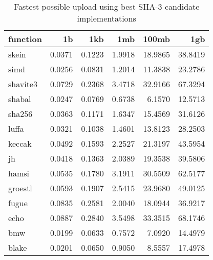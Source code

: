 \begin{table} 
  \centering 
    \begin{tabular}{ | l | r | r | r | r | r | }
      \hline
      \textbf{function} & \textbf{1b} & \textbf{1kb} & \textbf{1mb} & \textbf{100mb} & \textbf{1gb} \\ \hline
      skein & 0.0371 & 0.1223 & 1.9918 & 18.9865 & 38.8419 \\ \hline
      simd & 0.0256 & 0.0831 & 1.2014 & 11.3838 & 23.2786 \\ \hline
      shavite3 & 0.0729 & 0.2368 & 3.4718 & 32.9166 & 67.3294 \\ \hline
      shabal & 0.0247 & 0.0769 & 0.6738 & 6.1570 & 12.5713 \\ \hline
      sha256 & 0.0363 & 0.1171 & 1.6347 & 15.4569 & 31.6126 \\ \hline
      luffa & 0.0321 & 0.1038 & 1.4601 & 13.8123 & 28.2503 \\ \hline
      keccak & 0.0492 & 0.1593 & 2.2527 & 21.3197 & 43.5954 \\ \hline
      jh & 0.0418 & 0.1363 & 2.0389 & 19.3538 & 39.5806 \\ \hline
      hamsi & 0.0535 & 0.1780 & 3.1911 & 30.5509 & 62.5177 \\ \hline
      groestl & 0.0593 & 0.1907 & 2.5415 & 23.9680 & 49.0125 \\ \hline
      fugue & 0.0835 & 0.2581 & 2.0040 & 18.0944 & 36.9217 \\ \hline
      echo & 0.0887 & 0.2840 & 3.5498 & 33.3515 & 68.1746 \\ \hline
      bmw & 0.0199 & 0.0633 & 0.7572 & 7.0920 & 14.4979 \\ \hline
      blake & 0.0201 & 0.0650 & 0.9050 & 8.5557 & 17.4978 \\ \hline
      \end{tabular} 
      \caption{Fastest possible upload using best SHA-3 candidate implementations}
      \label{tbl:tahoe:optimized_p}
\end{table}

